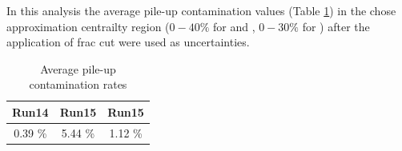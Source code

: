 In this analysis the average pile-up contamination values (Table \ref{table:pile_up_average}) in the chose approximation centrailty region ($0-40\%$ for \HeAu and \pAu, $0-30\%$ for \pAl) after the application of frac cut were used as uncertainties.

\begin{table}[h!]
	\centering
	\begin{tabular}{c|c|c}
		Run14 \HeAu & Run15 \pAl & Run15 \pAu \\
		\hline
		\hline
      0.39 \% & 5.44 \% & 1.12 \% \\
	\end{tabular}
   \caption{Average pile-up contamination rates}
	\label{table:pile_up_average}
\end{table}

